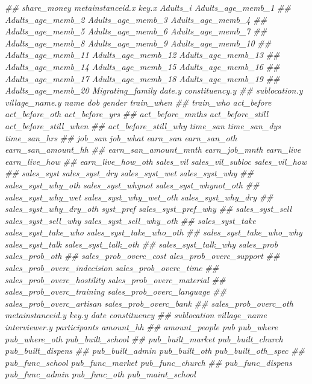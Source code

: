 \documentclass[
]{article}
\newenvironment{Shaded}{\begin{snugshade}}{\end{snugshade}}
\newcommand{\CommentTok}[1]{\textcolor[rgb]{0.56,0.35,0.01}{\textit{#1}}}
\begin{document}
\begin{Shaded}
\begin{Highlighting}[]
\CommentTok{##      share_money metainstanceid.x key.x Adults_i Adults_age_memb_1}
\CommentTok{##      Adults_age_memb_2 Adults_age_memb_3 Adults_age_memb_4}
\CommentTok{##      Adults_age_memb_5 Adults_age_memb_6 Adults_age_memb_7}
\CommentTok{##      Adults_age_memb_8 Adults_age_memb_9 Adults_age_memb_10}
\CommentTok{##      Adults_age_memb_11 Adults_age_memb_12 Adults_age_memb_13}
\CommentTok{##      Adults_age_memb_14 Adults_age_memb_15 Adults_age_memb_16}
\CommentTok{##      Adults_age_memb_17 Adults_age_memb_18 Adults_age_memb_19}
\CommentTok{##      Adults_age_memb_20 Migrating_family date.y constituency.y}
\CommentTok{##      sublocation.y village_name.y name dob gender train_when}
\CommentTok{##      train_who act_before act_before_oth act_before_yrs}
\CommentTok{##      act_before_mnths act_before_still act_before_still_when}
\CommentTok{##      act_before_still_why time_san time_san_dys time_san_hrs}
\CommentTok{##      job_san job_what earn_san earn_san_oth earn_san_amount_hh}
\CommentTok{##      earn_san_amount_mnth earn_job_mnth earn_live earn_live_how}
\CommentTok{##      earn_live_how_oth sales_vil sales_vil_subloc sales_vil_how}
\CommentTok{##      sales_syst sales_syst_dry sales_syst_wet sales_syst_why}
\CommentTok{##      sales_syst_why_oth sales_syst_whynot sales_syst_whynot_oth}
\CommentTok{##      sales_syst_why_wet sales_syst_why_wet_oth sales_syst_why_dry}
\CommentTok{##      sales_syst_why_dry_oth syst_pref sales_syst_pref_why}
\CommentTok{##      sales_syst_sell sales_syst_sell_why sales_syst_sell_why_oth}
\CommentTok{##      sales_syst_take sales_syst_take_who sales_syst_take_who_oth}
\CommentTok{##      sales_syst_take_who_why sales_syst_talk sales_syst_talk_oth}
\CommentTok{##      sales_syst_talk_why sales_prob sales_prob_oth}
\CommentTok{##      sales_prob_overc_cost ales_prob_overc_support}
\CommentTok{##      sales_prob_overc_indecision sales_prob_overc_time}
\CommentTok{##      sales_prob_overc_hostility sales_prob_overc_material}
\CommentTok{##      sales_prob_overc_training sales_prob_overc_language}
\CommentTok{##      sales_prob_overc_artisan sales_prob_overc_bank}
\CommentTok{##      sales_prob_overc_oth metainstanceid.y key.y date constituency}
\CommentTok{##      sublocation village_name interviewer.y participants amount_hh}
\CommentTok{##      amount_people pub pub_where pub_where_oth pub_built_school}
\CommentTok{##      pub_built_market pub_built_church pub_built_dispens}
\CommentTok{##      pub_built_admin pub_built_oth pub_built_oth_spec}
\CommentTok{##      pub_func_school pub_func_market pub_func_church}
\CommentTok{##      pub_func_dispens pub_func_admin pub_func_oth pub_maint_school}

\end{Highlighting}
\end{Shaded}
\end{document}
